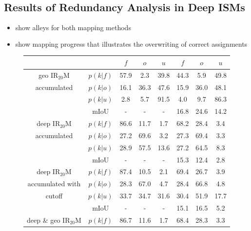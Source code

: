 \subsection{Results of Redundancy Analysis in Deep ISMs}
\label{subsec:results_of_red_analy}
\begin{itemize}
	\item show alleys for both mapping methods
	\item show mapping progress that illustrates the overwriting of correct assignments 
\end{itemize}
\begin{figure}[H]
	\begin{center}
		\begin{tabular}{c|c|ccc|ccc}
			& \backslashbox{}{\scriptsize{$k$}} & $f$ & $o$ & $u$ & $f$ & $o$ & $u$\\
			\hline
			geo IR$_{20}$M &$p(k|f)$ & \textcolor{mygreen}{57.9} & \textcolor{myred}{2.3} & 39.8& \textcolor{mygreen}{44.3} & \textcolor{myred}{5.9} & 49.8 \\
			accumulated &$p(k|o)$ & \textcolor{myred}{16.1} & \textcolor{mygreen}{36.3} & 47.6& \textcolor{myred}{15.9} & \textcolor{mygreen}{36.0} & 48.1 \\
			&$p(k|u)$ & 2.8 & 5.7 & 91.5& 4.0 & 9.7 & 86.3 \\
			& mIoU & - & - & - &16.8&24.6&14.2 \\
			\hline	
			deep IR$_{20}$M &$p(k|f)$ & \textcolor{mygreen}{86.6} & \textcolor{myred}{11.7} & 1.7& \textcolor{mygreen}{68.2} & \textcolor{myred}{28.4} & 3.4 \\
			accumulated &$p(k|o)$ & \textcolor{myred}{27.2} & \textcolor{mygreen}{69.6} & 3.2& \textcolor{myred}{27.3} & \textcolor{mygreen}{69.4} & 3.3 \\
			&$p(k|u)$ & 28.9 & 57.5 & 13.6& 27.2 & 64.5 & 8.3 \\
			& mIoU & - & - & - &15.3&12.4&2.8 \\
			\hline
			deep IR$_{20}$M &$p(k|f)$ & \textcolor{mygreen}{87.4} & \textcolor{myred}{10.5} & 2.1& \textcolor{mygreen}{69.4} & \textcolor{myred}{26.7} & 3.9 \\
			accumulated with&$p(k|o)$ & \textcolor{myred}{28.3} & \textcolor{mygreen}{67.0} & 4.7& \textcolor{myred}{28.4} & \textcolor{mygreen}{66.8} & 4.8 \\
			cutoff &$p(k|u)$ & 33.7 & 34.7 & 31.6& 30.4 & 51.9 & 17.7 \\
			& mIoU & - & - & - &15.1&16.5&5.2 \\
			\hline
			deep \& geo IR$_{20}$M &$p(k|f)$ & \textcolor{mygreen}{86.7} & \textcolor{myred}{11.6} & 1.7& \textcolor{mygreen}{68.4} & \textcolor{myred}{28.3} & 3.3 \\

\end{tabular}
\end{center}
\end{figure}
